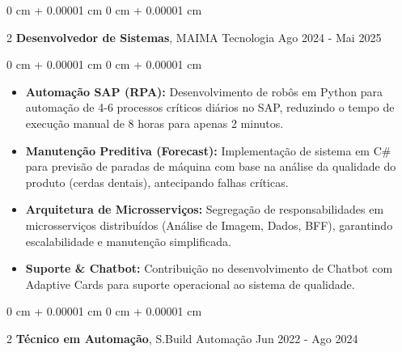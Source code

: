 \documentclass[10pt, letterpaper]{article}
\newenvironment{highlights}{ \begin{itemize}[ topsep=0.10 cm, parsep=0.10 cm, partopsep=0pt,
itemsep=0pt, leftmargin=0 cm + 10pt ] }{ \end{itemize} } %
\newenvironment{onecolentry}{ \begin{adjustwidth}{ 0 cm + 0.00001 cm }{ 0 cm + 0.00001 cm }
}{ \end{adjustwidth} } %
\newenvironment{twocolentry}[2][]{ \onecolentry \def\secondColumn{#2} \setcolumnwidth{\fill, 4.5 cm}
\begin{paracol}{2} }{ \switchcolumn \raggedleft \secondColumn \end{paracol}
\endonecolentry } %
\begin{document}
	\vspace{0.2 cm}
	
	\begin{twocolentry}
		{ Ago 2024 - Mai 2025 } \textbf{Desenvolvedor de Sistemas}, MAIMA Tecnologia
	\end{twocolentry}
	
	\vspace{0.10 cm}
	\begin{onecolentry}
		\begin{highlights}
            \item \textbf{Automação SAP (RPA):} Desenvolvimento de robôs em Python para automação de 4-6 processos críticos diários no SAP, reduzindo o tempo de execução manual de 8 horas para apenas 2 minutos.
			\item \textbf{Manutenção Preditiva (Forecast):} Implementação de sistema em C\# para previsão de paradas de máquina com base na análise da qualidade do produto (cerdas dentais), antecipando falhas críticas.
            \item \textbf{Arquitetura de Microsserviços:} Segregação de responsabilidades em microsserviços distribuídos (Análise de Imagem, Dados, BFF), garantindo escalabilidade e manutenção simplificada.
            \item \textbf{Suporte \& Chatbot:} Contribuição no desenvolvimento de Chatbot com Adaptive Cards para suporte operacional ao sistema de qualidade.
		\end{highlights}
	\end{onecolentry}
	
	\vspace{0.2 cm}
	
	\begin{twocolentry}
		{ Jun 2022 - Ago 2024 } \textbf{Técnico em Automação}, S.Build Automação
	\end{twocolentry}
	
\end{document}
